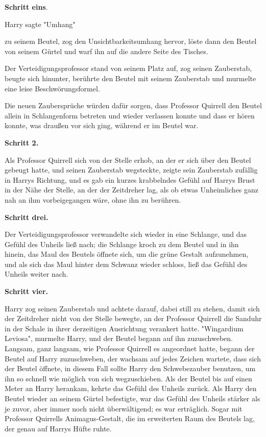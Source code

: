 {\textbf{Schritt eins}.

Harry sagte "Umhang"

zu seinem Beutel, zog den Unsichtbarkeitsumhang hervor, löste dann den Beutel von seinem Gürtel und warf ihn auf die andere Seite des Tisches.

Der Verteidigungsprofessor stand von seinem Platz auf, zog seinen Zauberstab, beugte sich hinunter, berührte den Beutel mit seinem Zauberstab und murmelte eine leise Beschwörungsformel.

Die neuen Zaubersprüche würden dafür sorgen, dass Professor Quirrell den Beutel allein in Schlangenform betreten und wieder verlassen konnte und dass er hören konnte, was draußen vor sich ging, während er im Beutel war.

\textbf{Schritt 2.}

Als Professor Quirrell sich von der Stelle erhob, an der er sich über den Beutel gebeugt hatte, und seinen Zauberstab wegsteckte, zeigte sein Zauberstab zufällig in Harrys Richtung, und es gab ein kurzes krabbelndes Gefühl auf Harrys Brust in der Nähe der Stelle, an der der Zeitdreher lag, als ob etwas Unheimliches ganz nah an ihm vorbeigegangen wäre, ohne ihn zu berühren.

\textbf{Schritt drei.}

Der Verteidigungsprofessor verwandelte sich wieder in eine Schlange, und das Gefühl des Unheils ließ nach; die Schlange kroch zu dem Beutel und in ihn hinein, das Maul des Beutels öffnete sich, um die grüne Gestalt aufzunehmen, und als sich das Maul hinter dem Schwanz wieder schloss, ließ das Gefühl des Unheils weiter nach.

\textbf{Schritt vier.}

Harry zog seinen Zauberstab und achtete darauf, dabei still zu stehen, damit sich der Zeitdreher nicht von der Stelle bewegte, an der Professor Quirrell die Sanduhr in der Schale in ihrer derzeitigen Ausrichtung verankert hatte. "Wingardium Leviosa", murmelte Harry, und der Beutel begann auf ihn zuzuschweben. Langsam, ganz langsam, wie Professor Quirrell es angeordnet hatte, begann der Beutel auf Harry zuzuschweben, der wachsam auf jedes Zeichen wartete, dass sich der Beutel öffnete, in diesem Fall sollte Harry den Schwebezauber benutzen, um ihn so schnell wie möglich von sich wegzuschieben. Als der Beutel bis auf einen Meter an Harry herankam, kehrte das Gefühl des Unheils zurück. Als Harry den Beutel wieder an seinem Gürtel befestigte, war das Gefühl des Unheils stärker als je zuvor, aber immer noch nicht überwältigend; es war erträglich. Sogar mit Professor Quirrells Animagus-Gestalt, die im erweiterten Raum des Beutels lag, der genau auf Harrys Hüfte ruhte.

}
